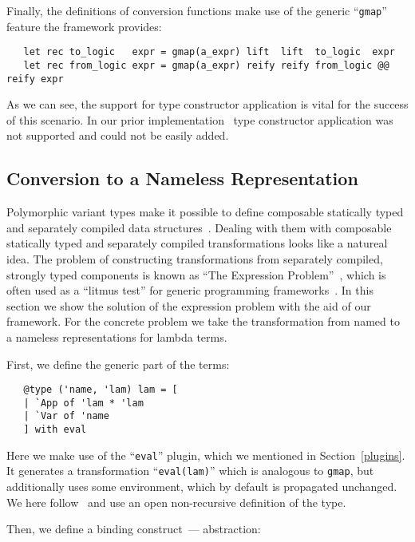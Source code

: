 Finally, the definitions of conversion functions make use of the generic ``\lstinline{gmap}'' feature the
framework provides:

\begin{lstlisting}
   let rec to_logic   expr = gmap(a_expr) lift  lift  to_logic  expr
   let rec from_logic expr = gmap(a_expr) reify reify from_logic @@ reify expr
\end{lstlisting}

As we can see, the support for type constructor application is vital for the success of this scenario. In our prior
implementation~\cite{TransformationObjects} type constructor application was not supported and could not be easily added.

\subsection{Conversion to a Nameless Representation}

Polymorphic variant types make it possible to define composable statically typed and separately compiled data structures~\cite{PolyVarReuse}.
Dealing with them with composable statically typed and separately compiled transformations looks like a natureal idea. The problem of
constructing transformations from separately compiled, strongly typed components is known as ``The Expression Problem''~\cite{ExpressionProblem}, which
is often used as a ``litmus test'' for generic programming frameworks~\cite{ObjectAlgebras,ALaCarte}. In this section we show the solution of
the expression problem with the aid of our framework. For the concrete problem we take the transformation from named to a nameless representations
for lambda terms.

First, we define the generic part of the terms:

\begin{lstlisting}
   @type ('name, 'lam) lam = [
   | `App of 'lam * 'lam
   | `Var of 'name
   ] with eval
\end{lstlisting}

Here we make use of the ``\lstinline{eval}'' plugin, which we mentioned in Section~\ref{plugins}. It generates a transformation ``\lstinline{eval(lam)}''
which is analogous to \lstinline{gmap}, but additionally uses some environment, which by default is propagated unchanged. We here follow~\cite{PolyVarReuse}
and use an open non-recursive definition of the type.

Then, we define a binding construct~--- abstraction:


